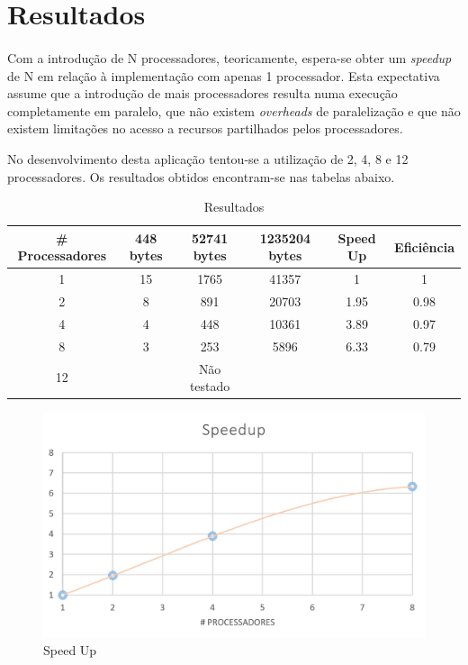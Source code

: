 \section{Resultados}
\paragraph{}
Com a introdução de N processadores, teoricamente, espera-se obter um \textit{speedup} de N em relação à implementação com apenas 1 processador. Esta expectativa assume que a introdução de mais processadores resulta numa execução completamente em paralelo, que não existem \textit{overheads} de paralelização e que não existem limitações no acesso a recursos partilhados pelos processadores.

No desenvolvimento desta aplicação tentou-se a utilização de 2, 4, 8 e 12 processadores. Os resultados obtidos encontram-se nas tabelas abaixo.

\begin{table}[H]
\centering
\begin{tabular}{c|ccc|cc}

\# Processadores            & 448 bytes & 52741 bytes & 1235204 bytes & Speed Up & Eficiência \\
\hline
1 & 15 & 1765 & 41357 & 1 & 1  \\
2 & 8 & 891 & 20703 & 1.95 & 0.98  \\
4 & 4 & 448 & 10361 & 3.89 & 0.97  \\
8 & 3 & 253 & 5896 & 6.33 & 0.79  \\
12 &  & Não testado & & &  \\
\end{tabular}
\caption{Resultados}
\end{table}

\begin{figure}[H]
\centering
\includegraphics[width=140mm]{SpeedUp.PNG}
\caption{Speed Up \label{Speed Up}}
\end{figure}


